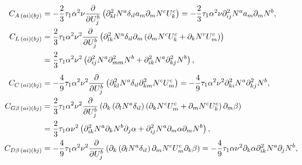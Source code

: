 \begin{align}
  C_{A\, (ai)(bj)}        & = - \frac{2}{3} \tau_1 \alpha^2 \nu \frac{\partial }{\partial U_j^b} \left( \partial^2_{kl} N^a \delta_{il} a_m \partial_m N^c U_k^c \right) = - \frac{2}{3} \tau_1 \alpha^2 \nu \partial^2_{ij} N^a a_m \partial_m N^b, \label{eq:CALHSStabilizationTerm}                                                                                \\
  C_{L\, (ai)(bj)}        & = \frac{2}{3} \tau_1 \alpha^2 \nu^2 \frac{\partial }{\partial U_j^b} \left( \partial^2_{lk} N^a \delta_{il} \partial_m \left( \partial_m N^c U_k^c + \partial_k N^c U_m^c \right) \right) \notag                                                                                                                                          \\
                          & =\vphantom{\frac{\partial }{\partial U_j^b}} \frac{2}{3} \tau_1 \alpha^2 \nu^2 \left(\partial^2_{ij} N^a \partial^2_{mm} N^b + \partial^2_{ik} N^a \partial^2_{kj} N^b\right), \label{eq:CLLHSStabilizationTerm}                                                                                                                          \\
  C_{C\, (ai)(bj)}        & = - \frac{4}{9} \tau_1 \alpha^2 \nu^2 \frac{\partial }{\partial U_j^b} \left( \partial^2_{kl} N^a \delta_{il} \partial^2_{km} N^c U_m^c \right) = - \frac{4}{9} \tau_1 \alpha^2 \nu^2 \partial^2_{ki} N^a \partial^2_{kj} N^b, \label{eq:CCLHSStabilizationTerm}                                                                          \\
  C_{G \beta \, (ai)(bj)} & = \frac{2}{3} \tau_1 \alpha^2 \nu^2 \frac{\partial }{\partial U_j^b} \left( \partial_k \left( \partial_l N^a \delta_{il} \right) \left( \partial_k N^c U_m^c + \partial_m N^c U_k^c \right) \partial_m \beta \right) \notag                                                                                                               \\
                          & = \frac{2}{3} \tau_1 \alpha \nu^2 \left( \partial_{ik}^2 N^a \partial_k N^b \partial_j \alpha + \partial_{ij}^2 N^a \partial_m \alpha \partial_m N^b \right), \label{eq:CGBetaLHSStabilizationTerm}                                                                                                                                       \\
  C_{D \beta \, (ai)(bj)} & = - \frac{4}{9} \tau_1 \alpha^2 \nu^2 \frac{\partial }{\partial U_j^b} \left( \partial_k \left( \partial_l N^a \delta_{il} \right) \partial_m N^c U_m^c \partial_k \beta \right) = - \frac{4}{9} \tau_1 \alpha \nu^2 \partial_k \alpha \partial_{ik}^2 N^a \partial_j N^b, \label{eq:CDBetaLHSStabilizationTerm}                          \\

\end{align}
